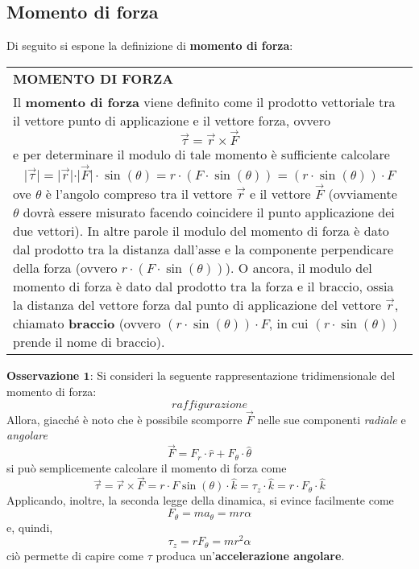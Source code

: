 \documentclass[a4paper]{extarticle}
\renewcommand\arraystretch{}
\begin{document}
\vspace{1em}
\subsection{Momento di forza}
Di seguito si espone la definizione di \textbf{momento di forza}:

\vspace{1em}
\setlength{\tabcolsep}{14pt}
\renewcommand{\arraystretch}{2}
\noindent
\begin{tabularx}{\textwidth}{@{}|P|@{}}
    \hline
    {\textbf{MOMENTO DI FORZA}}\\
    \parbox{\linewidth}{Il \textbf{momento di forza} viene definito come il prodotto vettoriale tra il vettore punto di applicazione e il vettore forza, ovvero
    \[\boxed{\vec \tau = \vec r \times \vec F}\]
    e per determinare il modulo di tale momento è sufficiente calcolare
    \[\vert \vec \tau \vert = \vert \vec r \vert \cdot \vert \vec F \vert \cdot \sin(\theta) = r \cdot (F \cdot \sin(\theta)) = (r \cdot \sin(\theta)) \cdot F\]
    ove $\theta$ è l'angolo compreso tra il vettore $\vec r$ e il vettore $\vec F$ (ovviamente $\theta$ dovrà essere misurato facendo coincidere il punto applicazione dei due vettori).\\
    In altre parole il modulo del momento di forza è dato dal prodotto tra la distanza dall'asse e la componente perpendicare della forza (ovvero $r \cdot (F \cdot \sin(\theta))$).\\
    O ancora, il modulo del momento di forza è dato dal prodotto tra la forza e il braccio, ossia la distanza del vettore forza dal punto di applicazione del vettore $\vec r$, chiamato \textbf{braccio} (ovvero $(r \cdot \sin(\theta)) \cdot F$, in cui $(r \cdot \sin(\theta))$ prende il nome di braccio).
    \vspace{3mm}}\\
    \hline
\end{tabularx}

\vspace{1em}
\noindent
\textbf{Osservazione $\boldsymbol{1}$}: Si consideri la seguente rappresentazione tridimensionale del momento di forza:
\[raffigurazione\]
Allora, giacché è noto che è possibile scomporre $\vec F$ nelle sue componenti \emph{radiale} e \emph{angolare}
\[\vec F = F_r \cdot \hat{r} + F_{\theta} \cdot \hat{\theta}\]
si può semplicemente calcolare il momento di forza come
\[\vec \tau = \vec r \times \vec F = r \cdot F \sin(\theta) \cdot \hat{k} = \tau_z \cdot \hat{k} = r \cdot F_\theta \cdot \hat{k}\]
Applicando, inoltre, la seconda legge della dinamica, si evince facilmente come
\[F_\theta=m a_\theta=mr\alpha\]
e, quindi,
\[\tau_z=r F_\theta=m r^2 \alpha\]
ciò permette di capire come $\tau$ produca un'\textbf{accelerazione angolare}.\\
\end{document}
